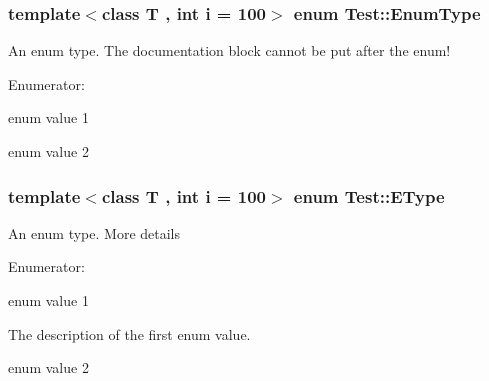 \hypertarget{class_test_a26bf93efdaea3c6e2cfa4119c3755d3f}{
\subsubsection[{Enum\-Type}]{\setlength{\rightskip}{0pt plus 5cm}template$<$class T , int i = 100$>$ enum {\bf Test\-::\-Enum\-Type}}}\label{class_test_a26bf93efdaea3c6e2cfa4119c3755d3f}
An enum type. The documentation block cannot be put after the enum! \begin{Desc}
\item[Enumerator\-: ]\par
\begin{description}
\item[{\em 
\hypertarget{class_test_a26bf93efdaea3c6e2cfa4119c3755d3fac5f5895ba2af9a9fa16f6840a45d659c}{E\-Val1}\label{class_test_a26bf93efdaea3c6e2cfa4119c3755d3fac5f5895ba2af9a9fa16f6840a45d659c}
}]enum value 1 \item[{\em 
\hypertarget{class_test_a26bf93efdaea3c6e2cfa4119c3755d3fa565724e73b1352aaa0af531d8018167e}{E\-Val2}\label{class_test_a26bf93efdaea3c6e2cfa4119c3755d3fa565724e73b1352aaa0af531d8018167e}
}]enum value 2 \end{description}
\end{Desc}

\hypertarget{class_test_a0653c5125502203305b6fe839e99ed01}{
\subsubsection[{E\-Type}]{\setlength{\rightskip}{0pt plus 5cm}template$<$class T , int i = 100$>$ enum {\bf Test\-::\-E\-Type}}}\label{class_test_a0653c5125502203305b6fe839e99ed01}
An enum type. More details \begin{Desc}
\item[Enumerator\-: ]\par
\begin{description}
\item[{\em 
\hypertarget{class_test_ad8d13fe56b896633273087859b89a1a3af621232782128e49458adf9069e126d4}{Val1}\label{class_test_ad8d13fe56b896633273087859b89a1a3af621232782128e49458adf9069e126d4}
}]enum value 1

The description of the first enum value. \item[{\em 
\hypertarget{class_test_ad8d13fe56b896633273087859b89a1a3a218603a97012ef8dce0b798d598b2866}{Val2}\label{class_test_ad8d13fe56b896633273087859b89a1a3a218603a97012ef8dce0b798d598b2866}
}]enum value 2 \end{description}
\end{Desc}

